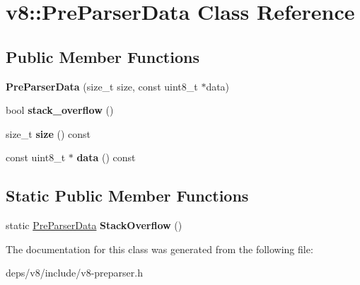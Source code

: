 \hypertarget{classv8_1_1_pre_parser_data}{}\section{v8\+:\+:Pre\+Parser\+Data Class Reference}
\label{classv8_1_1_pre_parser_data}
\subsection*{Public Member Functions}
\begin{DoxyCompactItemize}
\item 
\hypertarget{classv8_1_1_pre_parser_data_a088b2b5debdd1abe4951add57fdc83eb}{}{\bfseries Pre\+Parser\+Data} (size\+\_\+t size, const uint8\+\_\+t $\ast$data)\label{classv8_1_1_pre_parser_data_a088b2b5debdd1abe4951add57fdc83eb}

\item 
\hypertarget{classv8_1_1_pre_parser_data_a8980bcbec96380c30576488dc8d6e5fb}{}bool {\bfseries stack\+\_\+overflow} ()\label{classv8_1_1_pre_parser_data_a8980bcbec96380c30576488dc8d6e5fb}

\item 
\hypertarget{classv8_1_1_pre_parser_data_a050f25fa877938b4adf9769492abeea2}{}size\+\_\+t {\bfseries size} () const \label{classv8_1_1_pre_parser_data_a050f25fa877938b4adf9769492abeea2}

\item 
\hypertarget{classv8_1_1_pre_parser_data_ad83cb6c7ee2d73ca34b5ff9488a5a73d}{}const uint8\+\_\+t $\ast$ {\bfseries data} () const \label{classv8_1_1_pre_parser_data_ad83cb6c7ee2d73ca34b5ff9488a5a73d}

\end{DoxyCompactItemize}
\subsection*{Static Public Member Functions}
\begin{DoxyCompactItemize}
\item 
\hypertarget{classv8_1_1_pre_parser_data_ad27f26b962ffada1087417812d6e9257}{}static \hyperlink{classv8_1_1_pre_parser_data}{Pre\+Parser\+Data} {\bfseries Stack\+Overflow} ()\label{classv8_1_1_pre_parser_data_ad27f26b962ffada1087417812d6e9257}

\end{DoxyCompactItemize}


The documentation for this class was generated from the following file\+:\begin{DoxyCompactItemize}
\item 
deps/v8/include/v8-\/preparser.\+h\end{DoxyCompactItemize}
